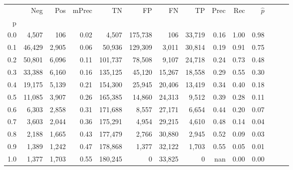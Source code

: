 \begin{tabular}{rrrrrrrrrrrrrr}
\toprule
{} &     Neg &    Pos & mPrec &       TN &       FP &      FN &      TP &  Prec &   Rec & $\hat{p}$ \\
p   &         &        &       &          &          &         &         &       &       &           \\
\midrule
0.0 &   4,507 &    106 &  0.02 &    4,507 &  175,738 &     106 &  33,719 &  0.16 &  1.00 &      0.98 \\
0.1 &  46,429 &  2,905 &  0.06 &   50,936 &  129,309 &   3,011 &  30,814 &  0.19 &  0.91 &      0.75 \\
0.2 &  50,801 &  6,096 &  0.11 &  101,737 &   78,508 &   9,107 &  24,718 &  0.24 &  0.73 &      0.48 \\
0.3 &  33,388 &  6,160 &  0.16 &  135,125 &   45,120 &  15,267 &  18,558 &  0.29 &  0.55 &      0.30 \\
0.4 &  19,175 &  5,139 &  0.21 &  154,300 &   25,945 &  20,406 &  13,419 &  0.34 &  0.40 &      0.18 \\
0.5 &  11,085 &  3,907 &  0.26 &  165,385 &   14,860 &  24,313 &   9,512 &  0.39 &  0.28 &      0.11 \\
0.6 &   6,303 &  2,858 &  0.31 &  171,688 &    8,557 &  27,171 &   6,654 &  0.44 &  0.20 &      0.07 \\
0.7 &   3,603 &  2,044 &  0.36 &  175,291 &    4,954 &  29,215 &   4,610 &  0.48 &  0.14 &      0.04 \\
0.8 &   2,188 &  1,665 &  0.43 &  177,479 &    2,766 &  30,880 &   2,945 &  0.52 &  0.09 &      0.03 \\
0.9 &   1,389 &  1,242 &  0.47 &  178,868 &    1,377 &  32,122 &   1,703 &  0.55 &  0.05 &      0.01 \\
1.0 &   1,377 &  1,703 &  0.55 &  180,245 &        0 &  33,825 &       0 &   nan &  0.00 &      0.00 \\
\bottomrule
\end{tabular}

